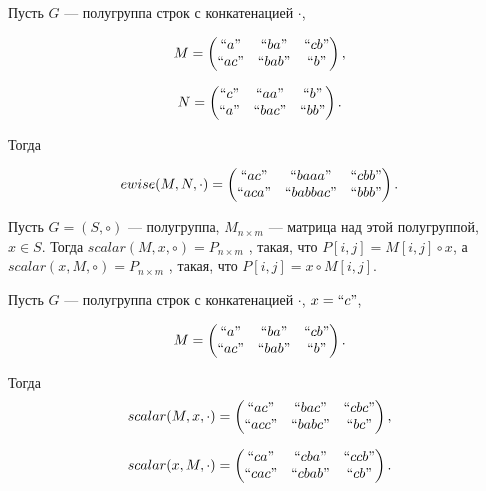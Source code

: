 \begin{example}

	Пусть $G$ --- полугруппа строк с конкатенацией $\cdot$,

	$$
		M =
		\begin{pmatrix}
			``a"  & ``ba"  & ``cb" \\
			``ac" & ``bab" & ``b"  \\
		\end{pmatrix},
	$$

	$$
		N =
		\begin{pmatrix}
			``c" & ``aa"  & ``b"  \\
			``a" & ``bac" & ``bb" \\
		\end{pmatrix}.
	$$

	Тогда

	$$
		ewise(M,N, \cdot) =
		\begin{pmatrix}
			``ac"  & ``baaa"   & ``cbb" \\
			``aca" & ``babbac" & ``bbb" \\
		\end{pmatrix}.
	$$


\end{example}


\begin{definition}
	Пусть $G = (S,\circ)$ --- полугруппа, $M_{n \times m}$ --- матрица над этой полугруппой, $x \in S$.
	Тогда
	$
		scalar(M,x,\circ) = P_{n \times m}
	$
	, такая, что $P[i,j] = M[i,j] \circ x$, а
	$
		scalar(x,M,\circ) = P_{n \times m}
	$
	, такая, что $P[i,j] = x \circ M[i,j]$.

\end{definition}

\begin{example}

	Пусть $G$ --- полугруппа строк с конкатенацией $\cdot$, $x = ``c"$,

	$$
		M =
		\begin{pmatrix}
			``a"  & ``ba"  & ``cb" \\
			``ac" & ``bab" & ``b"  \\
		\end{pmatrix}.
	$$

	Тогда
	$$
		scalar(M,x, \cdot) =
		\begin{pmatrix}
			``ac"  & ``bac"  & ``cbc" \\
			``acc" & ``babc" & ``bc"  \\
		\end{pmatrix},
	$$

	$$
		scalar(x, M, \cdot) =
		\begin{pmatrix}
			``ca"  & ``cba"  & ``ccb" \\
			``cac" & ``cbab" & ``cb"  \\
		\end{pmatrix}.
	$$

\end{example}


